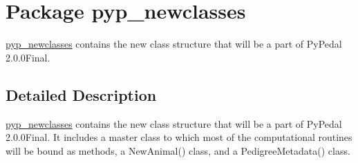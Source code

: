 \hypertarget{namespacepyp__newclasses}{
\section{Package pyp\_\-newclasses}
\label{namespacepyp__newclasses}
}


\hyperlink{namespacepyp__newclasses}{pyp\_\-newclasses} contains the new class structure that will be a part of PyPedal 2.0.0Final.  




\subsection{Detailed Description}
\hyperlink{namespacepyp__newclasses}{pyp\_\-newclasses} contains the new class structure that will be a part of PyPedal 2.0.0Final. It includes a master class to which most of the computational routines will be bound as methods, a NewAnimal() class, and a PedigreeMetadata() class. 
